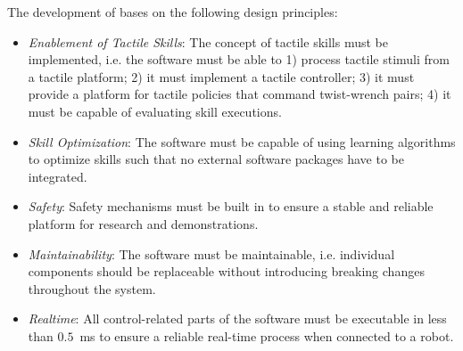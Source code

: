 The development of \softwareabbr{} bases on the following design principles:
\begin{itemize}
    \item \emph{Enablement of Tactile Skills}: The concept of tactile skills must be implemented, i.e. the software must be able to 1) process tactile stimuli from a tactile platform; 2) it must implement a tactile controller; 3) it must provide a platform for tactile policies that command twist-wrench pairs; 4) it must be capable of evaluating skill executions.
    \item \emph{Skill Optimization}: The software must be capable of using learning algorithms to optimize skills such that no external software packages have to be integrated.
    \item \emph{Safety}: Safety mechanisms must be built in to ensure a stable and reliable platform for research and demonstrations.
    \item \emph{Maintainability}: The software must be maintainable, i.e. individual components should be replaceable without introducing breaking changes throughout the system.
    \item \emph{Realtime}: All control-related parts of the software must be executable in less than $0.5$~ms to ensure a reliable real-time process when connected to a robot.
\end{itemize}